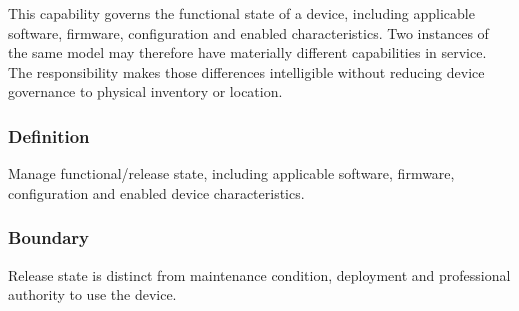 This capability governs the functional state of a device, including applicable software, firmware, configuration and enabled characteristics. Two instances of the same model may therefore have materially different capabilities in service. The responsibility makes those differences intelligible without reducing device governance to physical inventory or location.

\subsubsection*{Definition}

Manage functional/\allowbreak{}release state, including applicable software, firmware, configuration and enabled device characteristics.

\subsubsection*{Boundary}

Release state is distinct from maintenance condition, deployment and professional authority to use the device.

